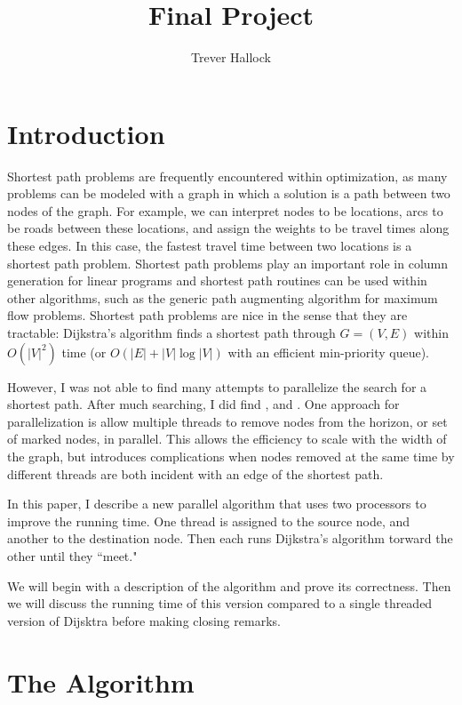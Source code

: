 \documentclass{article}
\author{Trever Hallock}
\title{Final Project}
\begin{document}
\maketitle

\pagebreak

\section{Introduction}
Shortest path problems are frequently encountered within optimization, as many problems can be modeled with a graph in which a solution is a path between two nodes of the graph.
For example, we can interpret nodes to be locations, arcs to be roads between these locations, and assign the weights to be travel times along these edges.
In this case, the fastest travel time between two locations is a shortest path problem.
Shortest path problems play an important role in column generation for linear programs and shortest path routines can be used within other algorithms, such as the generic path augmenting algorithm for maximum flow problems.
Shortest path problems are nice in the sense that they are tractable: Dijkstra's algorithm finds a shortest path through $G=(V,E)$ within $O(|V|^2)$ time 
(or $O(|E| + |V| \log |V|)$ with an efficient min-priority queue).

However, I was not able to find many attempts to parallelize the search for a shortest path.
After much searching, I did find \cite{par1}, \cite{par2} and \cite{par3}.
One approach for parallelization is allow multiple threads to remove nodes from the horizon, or set of marked nodes, in parallel.
This allows the efficiency to scale with the width of the graph, but introduces complications when nodes removed at the same time by different threads are both incident with an edge of the shortest path.

In this paper, I describe a new parallel algorithm that uses two processors to improve the running time.
One thread is assigned to the source node, and another to the destination node.
Then each runs Dijkstra's algorithm torward the other until they ``meet."

We will begin with a description of the algorithm and prove its correctness.
Then we will discuss the running time of this version compared to a single threaded version of Dijsktra before making closing remarks.

\section{The Algorithm}
\end{document}
